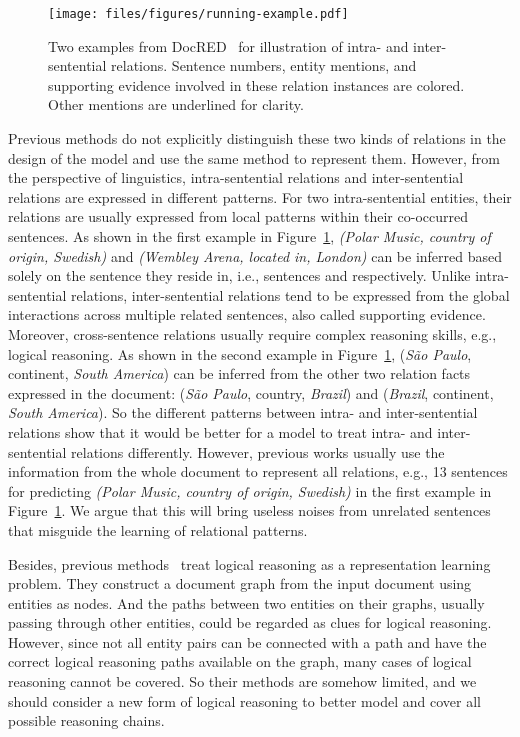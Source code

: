 \documentclass[11pt,a4paper]{article}
\begin{document}
\begin{figure}
    \centering
    \texttt{[image: files/figures/running-example.pdf]}
    \caption{Two examples from DocRED~\citep{DocRED-paper} for illustration of intra- and inter-sentential relations. Sentence numbers, entity mentions, and supporting evidence involved in these relation instances are colored. Other mentions are underlined for clarity.}
    \label{fig:running-example}
\end{figure}
Previous methods do not explicitly distinguish these two kinds of relations in the design of the model and use the same method to represent them. 
However, from the perspective of linguistics, intra-sentential relations and inter-sentential relations are expressed in different patterns. For two intra-sentential entities, their relations are usually expressed from local patterns within their co-occurred sentences. As shown in the first example in Figure~\ref{fig:running-example}, \textit{(Polar Music, country of origin, Swedish)} and \textit{(Wembley Arena, located in, London)} can be inferred based solely on the sentence they reside in, i.e., sentences  and  respectively. Unlike intra-sentential relations, inter-sentential relations tend to be expressed from the global interactions across multiple related sentences, also called supporting evidence. Moreover, cross-sentence relations usually require complex reasoning skills, e.g., logical reasoning. As shown in the second example in Figure~\ref{fig:running-example}, (\textit{São Paulo}, continent, \textit{South America}) can be inferred from the other two relation facts expressed in the document: (\textit{São Paulo}, country, \textit{Brazil}) and (\textit{Brazil}, continent, \textit{South America}). So the different patterns between intra- and inter-sentential relations show that it would be better for a model to treat intra- and inter-sentential relations differently. However, previous works usually use the information from the whole document to represent all relations, e.g., 13 sentences for predicting \textit{(Polar Music, country of origin, Swedish)} in the first example in Figure~\ref{fig:running-example}. We argue that this will bring useless noises from unrelated sentences that misguide the learning of relational patterns. 




Besides, previous methods~\citep{EoG,GAIN} treat logical reasoning as a representation learning problem. They construct a document graph from the input document using entities as nodes. And the paths between two entities on their graphs, usually passing through other entities, could be regarded as clues for logical reasoning. 
However, since not all entity pairs can be connected with a path and have the correct logical reasoning paths available on the graph, many cases of logical reasoning cannot be covered. So their methods are somehow limited, and we should consider a new form of logical reasoning to better model and cover all possible reasoning chains.
\end{document}
